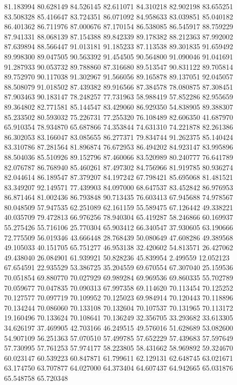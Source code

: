 81.183994
80.628149
84.526145
82.611071
84.310218
82.902198
83.655251
83.508328
85.416647
83.724351
86.071092
84.958633
83.039851
85.040182
86.401362
86.711976
87.000676
87.170154
86.538085
86.545917
88.759229
87.941331
88.068139
87.154388
89.842339
89.178382
88.212363
87.992002
87.639894
88.566447
91.013181
91.185233
87.113538
89.301835
91.659492
89.998300
89.047505
90.563392
91.454505
90.564800
91.090046
91.041691
91.287933
90.053732
89.788860
87.316680
89.513547
90.831122
89.705814
89.752970
90.117038
91.302967
91.566056
89.165878
89.137051
92.045057
88.508079
91.018502
87.439382
89.916566
87.384578
78.080875
87.308451
87.903463
90.183147
78.248257
77.731963
58.988419
57.852286
82.955659
89.364802
82.771581
85.144547
83.429060
86.929350
54.838905
89.388307
85.233502
80.593032
75.226731
77.255320
76.108489
82.606350
41.687970
65.910354
78.934870
65.687866
74.353844
74.631310
74.221878
82.261386
86.302053
83.166047
83.085655
86.277371
79.834744
91.262375
85.140424
83.310786
87.281564
81.896874
76.672953
86.494202
84.923147
83.995896
88.504036
85.510926
89.152796
87.460066
83.520989
80.240777
76.641789
82.076787
86.768940
85.460261
87.497302
84.756966
81.919785
80.936274
82.044614
86.189547
87.379207
84.197242
67.798421
85.695068
81.481521
83.349207
92.149571
77.439903
84.097000
68.647537
83.452842
86.976953
86.871464
81.002436
86.793848
90.713435
76.603413
67.945688
74.978567
80.048509
57.947535
62.251089
62.161159
55.589475
67.126442
49.338221
40.035709
79.472813
66.976256
78.940304
65.419287
58.246866
60.169937
55.275426
55.716106
25.770304
65.903412
66.340547
37.930605
63.190666
72.775509
56.019346
43.666448
28.768439
50.080649
47.608286
49.389568
49.105033
40.151705
65.751277
46.953138
32.420602
54.813571
26.427062
49.438040
26.084901
61.939921
50.828236
45.839954
2.499559
12.052123
67.654591
22.935529
53.386725
35.204559
69.670554
67.307040
25.159536
70.051854
69.880770
70.027929
69.989284
69.969536
69.860335
55.702789
70.059677
70.047835
70.090313
67.997358
69.114620
70.113454
70.125252
70.127577
70.097719
70.109952
70.125023
69.984914
70.120443
70.118896
70.134244
70.086060
70.133108
70.132604
70.107537
70.131965
70.113172
19.160496
70.133624
70.108641
70.136249
32.356705
33.293682
33.613305
34.626197
37.469905
42.703166
46.249515
49.576016
51.628689
53.082600
54.907109
56.251363
57.070510
57.499785
57.652229
57.439683
57.597649
57.730995
57.761253
57.974177
58.223805
58.431662
58.969892
59.324670
60.023147
60.539223
60.847871
61.799611
62.129131
62.648745
63.021671
63.174750
63.707877
64.027000
64.373404
64.607437
64.942665
65.031876
65.548758
65.720348
